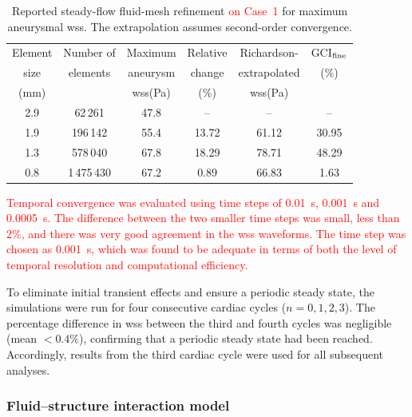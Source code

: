 \documentclass[12pt,a4paper]{article}
\newcommand{\cfdrevision}[1]{\textcolor{red}{#1}}
\newcommand{\WSS}{\ac{wss}\xspace}
\theoremstyle{definition}
\numberwithin{equation}{section}
\newcommand{\revision}[1]{\textcolor{red}{#1}}
\begin{document}
\begin{table}[ht!]
\centering
\setlength{\tabcolsep}{3.5pt}
\caption{Reported steady-flow fluid-mesh refinement  \revision{\cfdrevision{on Case~1} } for maximum aneurysmal \WSS. The extrapolation assumes second-order convergence.}
\label{tab:mesh_study}
\setlength{\tabcolsep}{7pt}
\begin{tabular}{cccccc}
\toprule
Element & Number of & Maximum & Relative & Richardson- & GCI$_{\rm fine}$ \\
size & elements & aneurysm & change & extrapolated & (\%) \\
(mm) & & \WSS (Pa) & (\%) & \WSS (Pa) & \\
\midrule
2.9 & 62\,261    & 47.8 & --    & --    & -- \\
1.9 & 196\,142   & 55.4 & 13.72 & 61.12 & 30.95 \\
1.3 & 578\,040   & 67.8 & 18.29 & 78.71 & 48.29 \\
0.8 & 1\,475\,430 & 67.2 & 0.89  & 66.83 & 1.63 \\
\bottomrule
\end{tabular}
\end{table}

\revision{Temporal convergence was evaluated using time steps of 0.01~s, 0.001~s and 0.0005~s. The difference between the two smaller time steps was small, less than 2\%, and there was very good agreement in the \WSS waveforms. The time step was chosen as 0.001~s, which was found to be adequate in terms of both the level of temporal resolution and computational efficiency.}

To eliminate initial transient effects and ensure a periodic steady state, the simulations were run for four consecutive cardiac cycles (\(n = 0,1,2,3\)). The percentage difference in \WSS between the third and fourth cycles was negligible (mean \(< 0.4\%\)), confirming that a periodic steady state had been reached. Accordingly, results from the third cardiac cycle were used for all subsequent analyses.

\subsubsection{Fluid--structure interaction model}
\end{document}
